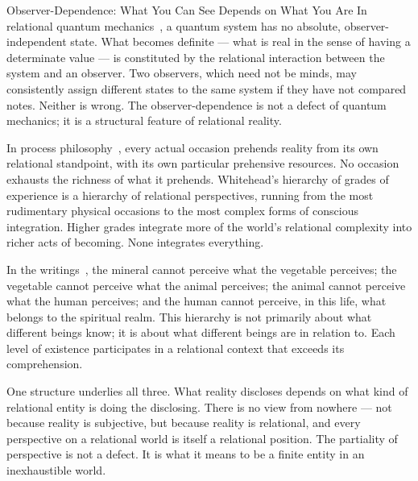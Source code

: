 \begin{convergencemoment}{Observer-Dependence: What You Can See Depends on What You Are}
In relational quantum mechanics~\citep{Rovelli1996}, a quantum system has no absolute, observer-independent state.
What becomes definite --- what is real in the sense of having a determinate value --- is constituted by the relational interaction between the system and an observer.
Two observers, which need not be minds, may consistently assign different states to the same system if they have not compared notes.
Neither is wrong.
The observer-dependence is not a defect of quantum mechanics; it is a structural feature of relational reality.

In process philosophy~\citep{Whitehead1929,Whitehead1933}, every actual occasion prehends reality from its own relational standpoint, with its own particular prehensive resources.
No occasion exhausts the richness of what it prehends.
Whitehead's hierarchy of grades of experience is a hierarchy of relational perspectives, running from the most rudimentary physical occasions to the most complex forms of conscious integration.
Higher grades integrate more of the world's relational complexity into richer acts of becoming.
None integrates everything.

In the \bahai writings~\citep[Part 4]{SAQ}, the mineral cannot perceive what the vegetable perceives; the vegetable cannot perceive what the animal perceives; the animal cannot perceive what the human perceives; and the human cannot perceive, in this life, what belongs to the spiritual realm.
This hierarchy is not primarily about what different beings know; it is about what different beings are in relation to.
Each level of existence participates in a relational context that exceeds its comprehension.

One structure underlies all three.
What reality discloses depends on what kind of relational entity is doing the disclosing.
There is no view from nowhere --- not because reality is subjective, but because reality is relational, and every perspective on a relational world is itself a relational position.
The partiality of perspective is not a defect.
It is what it means to be a finite entity in an inexhaustible world.
\end{convergencemoment}
